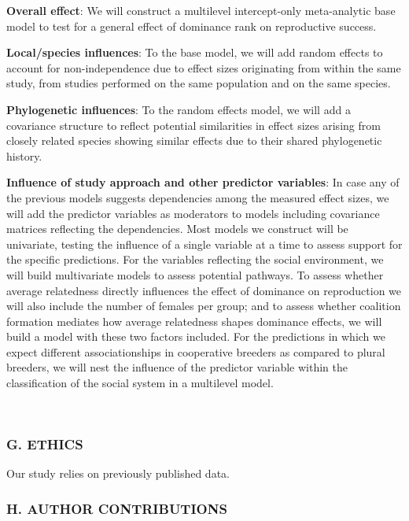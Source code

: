\documentclass[]{article}
\begin{document}
\textbf{Overall effect}: We will construct a multilevel intercept-only
meta-analytic base model to test for a general effect of dominance rank
on reproductive success.

\textbf{Local/species influences}: To the base model, we will add random
effects to account for non-independence due to effect sizes originating
from within the same study, from studies performed on the same
population and on the same species.

\textbf{Phylogenetic influences}: To the random effects model, we will
add a covariance structure to reflect potential similarities in effect
sizes arising from closely related species showing similar effects due
to their shared phylogenetic history.

\textbf{Influence of study approach and other predictor variables}: In
case any of the previous models suggests dependencies among the measured
effect sizes, we will add the predictor variables as moderators to
models including covariance matrices reflecting the dependencies. Most
models we construct will be univariate, testing the influence of a
single variable at a time to assess support for the specific
predictions. For the variables reflecting the social environment, we
will build multivariate models to assess potential pathways. To assess
whether average relatedness directly influences the effect of dominance
on reproduction we will also include the number of females per group;
and to assess whether coalition formation mediates how average
relatedness shapes dominance effects, we will build a model with these
two factors included. For the predictions in which we expect different
associationships in cooperative breeders as compared to plural breeders,
we will nest the influence of the predictor variable within the
classification of the social system in a multilevel model.

~

\hypertarget{g.-ethics}{%
\subsubsection{G. ETHICS}\label{g.-ethics}}

Our study relies on previously published data.

\hypertarget{h.-author-contributions}{%
\subsubsection{H. AUTHOR CONTRIBUTIONS}\label{h.-author-contributions}}
\end{document}
